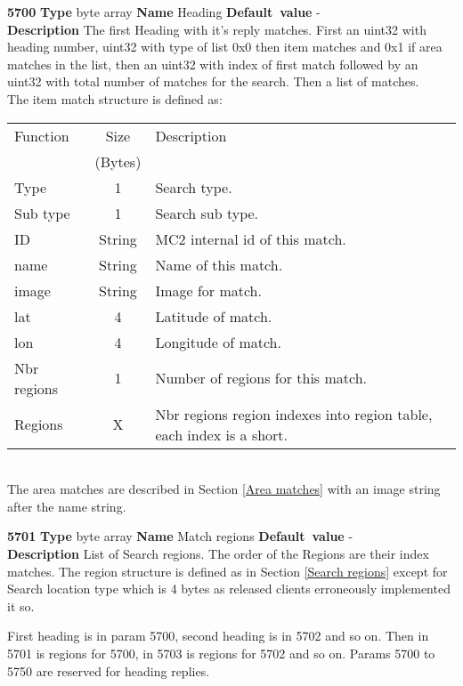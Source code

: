 \documentclass[a4paper]{article}
\begin{document}
\begin{list}{\textbf{ParamID}}{}
\item \textbf{5700} \textbf{Type} byte array \textbf{Name} Heading
                 \textbf{Default~value} - \\
  \label{combined_search_rep:Heading}
  \textbf{Description} The first Heading with it's reply matches.
  First an uint32 with heading number, uint32 with type of list 0x0 then item 
  matches and 0x1 if area matches in the list, 
  then an uint32 with index of first match
  followed by an uint32 with total number of matches for the search.
  Then a list of matches. \\
  The item match structure is defined as:\\
  \begin{tabular}{|l|c|p{7cm}|}
    \hline
    Function  & Size    & Description \\
              & (Bytes) &             \\\hline
    Type        & 1       & Search type.                          \\\hline
    Sub type    & 1       & Search sub type.                      \\\hline
    ID          & String  & MC2 internal id of this match.        \\\hline
    name        & String  & Name of this match.                   \\\hline
    image       & String  & Image for match.                      \\\hline
    lat         & 4       & Latitude of match.                    \\\hline
    lon         & 4       & Longitude of match.                   \\\hline
    Nbr regions & 1       & Number of regions for this match.     \\\hline
    Regions     & X       & Nbr regions region indexes into region table, each 
                            index is a short.                     \\\hline
  \end{tabular}\\
  The area matches are described in Section \ref{Area matches} with an image
  string after the name string.
\item \textbf{5701} \textbf{Type} byte array \textbf{Name} Match regions
                 \textbf{Default~value} - \\
  \label{Match regions}
  \textbf{Description} List of Search regions. The order of the Regions are
  their index matches. 
  The region structure is defined as in Section \ref{Search regions} except
  for Search location type which is 4 bytes as released clients erroneously
  implemented it so.
\end{list}
First heading is in param 5700, second heading is in 5702 and so on.
Then in 5701 is regions for 5700, in 5703 is regions for 5702 and so on.
Params 5700 to 5750 are reserved for heading replies.
\end{document}
